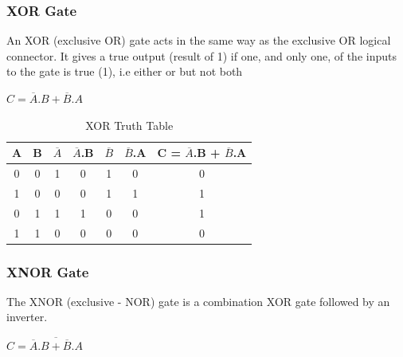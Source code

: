 \documentclass{article}
\begin{document}
				\subsubsection{XOR Gate}
					An XOR (exclusive OR) gate acts in the same way as the exclusive OR logical connector. 
					It gives a true output (result of 1) if one, and only one, of the inputs to the gate is true (1), i.e either or but not both
						\begin{center}
							\begin{math}
								C = \overline{A}.B + \overline{B}.A
							\end{math}
						\end{center}
					
						\begin{table}[h!]
							\centering
							\caption{XOR Truth Table}
							\label{tab 2: XOR table}
							\begin{tabular}{|c|c|c|c|c|c|c|}
								
							\rowcolor{blue!60}	A & B & $\overline{A}$ & $\overline{A}$.B & $\overline{B}$ & $\overline{B}$.A & C = $\overline{A}$.B + $\overline{B}$.A  \\
								\hline
							\rowcolor{blue!10}	0 & 0 & 1 & 0 & 1 & 0 & 0\\
							\rowcolor{blue!20}	1 & 0 & 0 & 0 & 1 & 1 & 1\\
							\rowcolor{blue!10}	0 & 1 & 1 & 1 & 0 & 0 & 1\\
							\rowcolor{blue!20}	1 & 1 & 0 & 0 & 0 & 0 & 0 \\ \hline
								
							\end{tabular}
						\end{table}
					
				\subsubsection{XNOR Gate}
					The XNOR (exclusive - NOR) gate is a combination XOR gate followed by an inverter. 
						\begin{center}
							\begin{math}
								C= \overline{\overline{A}.B + \overline{B}.A}
							\end{math}
						\end{center}
					
\end{document}
